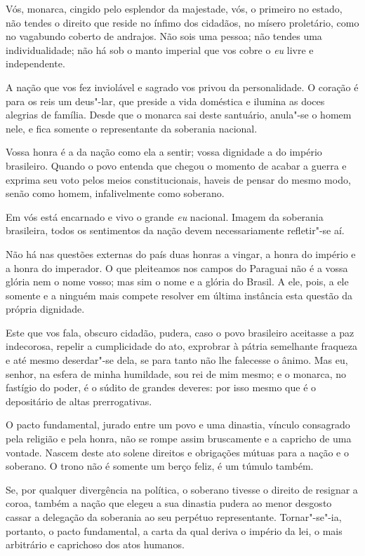 Vós, monarca, cingido pelo esplendor da majestade, vós, o primeiro no
estado, não tendes o direito que reside no ínfimo dos cidadãos, no
mísero proletário, como no vagabundo coberto de andrajos. Não sois uma
pessoa; não tendes uma individualidade; não há sob o manto imperial que
vos cobre o \textit{eu} livre e independente. 

A nação que vos fez inviolável e sagrado vos privou da personalidade. O
coração é para os reis um deus"-lar, que preside a vida doméstica e
ilumina as doces alegrias de família. Desde que o monarca sai deste
santuário, anula"-se o homem nele, e fica somente o representante da
soberania nacional. 

Vossa honra é a da nação como ela a sentir; vossa dignidade a do império
brasileiro. Quando o povo entenda que chegou o momento de acabar a
guerra e exprima seu voto pelos meios constitucionais, haveis de pensar
do mesmo modo, senão como homem, infalivelmente como soberano.

Em vós está encarnado e vivo o grande \textit{eu} nacional. Imagem da
soberania brasileira, todos os sentimentos da nação devem
necessariamente refletir"-se aí. 

Não há nas questões externas do país duas honras a vingar, a honra do
império e a honra do imperador. O que pleiteamos nos campos do Paraguai
não é a vossa glória nem o nome vosso; mas sim o nome e a glória do
Brasil. A ele, pois, a ele somente e a ninguém mais compete resolver em
última instância esta questão da própria dignidade. 

Este que vos fala, obscuro cidadão, pudera, caso o povo brasileiro
aceitasse a paz indecorosa, repelir a cumplicidade do ato, exprobrar à
pátria semelhante fraqueza e até mesmo deserdar"-se dela, se para
tanto não lhe falecesse o ânimo. Mas eu, senhor, na esfera de minha
humildade, sou rei de mim mesmo; e o monarca, no fastígio do poder, é o
súdito de grandes deveres: por isso mesmo que é o depositário de altas prerrogativas.

O pacto fundamental, jurado entre um povo e uma dinastia, vínculo
consagrado pela religião e pela honra, não se rompe assim bruscamente e
a capricho de uma vontade. Nascem deste ato solene direitos e
obrigações mútuas para a nação e o soberano. O trono não é somente um
berço feliz, é um túmulo também.

Se, por qualquer divergência na política, o soberano tivesse o direito
de resignar a coroa, também a nação que elegeu a sua dinastia pudera ao
menor desgosto cassar a delegação da soberania ao seu perpétuo
representante. Tornar"-se"-ia, portanto, o pacto fundamental, a carta
da qual deriva o império da lei, o mais arbitrário e caprichoso dos atos humanos.

